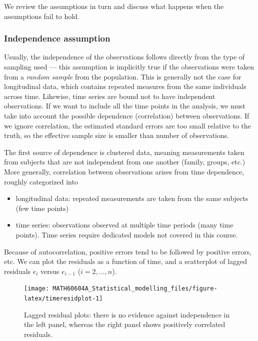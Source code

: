 \documentclass[
  11pt,
  letterpaper,
]{book}
\providecommand{\tightlist}{%
  \setlength{\itemsep}{0pt}\setlength{\parskip}{0pt}}
\theoremstyle{definition}
\theoremstyle{definition}
\theoremstyle{definition}
\theoremstyle{remark}
\begin{document}
We review the assumptions in turn and discuss what happens when the assumptions fail to hold.

\hypertarget{independence-assumption}{%
\subsubsection{Independence assumption}\label{independence-assumption}}

Usually, the independence of the observations follows directly from the type of sampling used --- this assumption is implicitly true if the observations were taken from a \emph{random sample} from the population. This is generally not the case for longitudinal data, which contains repeated measures from the same individuals across time. Likewise, time series are bound not to have independent observations. If we want to include all the time points in the analysis, we must take into account the possible dependence (correlation) between observations. If we ignore correlation, the estimated standard errors are too small relative to the truth, so the effective sample size is smaller than number of observations.

The first source of dependence is clustered data, meaning measurements taken from subjects that are not independent from one another (family, groups, etc.)
More generally, correlation between observations arises from time dependence, roughly categorized into

\begin{itemize}
\tightlist
\item
  longitudinal data: repeated measurements are taken from the same subjects (few time points)
\item
  time series: observations observed at multiple time periods (many time points). Time series require dedicated models not covered in this course.
\end{itemize}

Because of autocorrelation, positive errors tend to be followed by positive errors, etc. We can plot the residuals as a function of time, and a scatterplot of lagged residuals \(e_i\) versus \(e_{i-1}\) (\(i=2, \ldots, n\)).

\begin{figure}

{\centering \texttt{[image: MATH60604A\_Statistical\_modelling\_files/figure-latex/timeresidplot-1]} 

}

\caption{Lagged residual plots: there is no evidence against independence in the left panel, whereas the right panel shows positively correlated residuals.}\label{fig:timeresidplot}
\end{figure}
\end{document}
